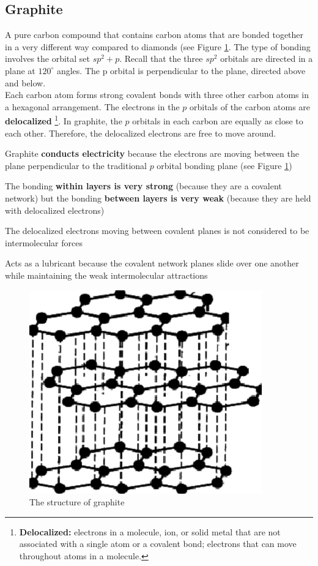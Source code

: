 \subsection{Graphite}
A pure carbon compound that contains carbon atoms that are bonded together in a very different 
way compared to diamonds (see Figure \ref{fig:graphite-structure}. The type of bonding involves the
orbital set $sp^2+p$. Recall that the three $sp^2$ orbitals are directed in a plane at $120^{\circ}$
angles. The p orbital is perpendicular to the plane, directed above and below.\\

Each carbon atom forms strong covalent bonds with three other carbon atoms in a hexagonal arrangement.
The electrons in the $p$ orbitals of the carbon atoms are \textbf{delocalized}
\footnote{
    \textbf{Delocalized:} electrons in a molecule, ion, or solid metal that are not associated
    with a single atom or a covalent bond; electrons that can move throughout atoms in a molecule.
}.
In graphite, the $p$ orbitals in each carbon are equally as close to each other. Therefore,
the delocalized electrons are free to move around.

\begin{bulleted-list}
    \item Graphite \textbf{conducts electricity} because the electrons are moving between the plane
        perpendicular to the traditional $p$ orbital bonding plane (see Figure \ref{fig:graphite-structure})
    \item The bonding \textbf{within layers is very strong} (because they are a covalent network)
        but the bonding \textbf{between layers is very weak} (because they are held with delocalized electrons)
    \item The delocalized electrons moving between covalent planes is not considered to be 
        intermolecular forces
    \item Acts as a lubricant because the covalent network planes slide over one another while
        maintaining the weak intermolecular attractions
\end{bulleted-list}

\begin{figure}[ht!]
    \centering
    \includegraphics[width=0.3 \textwidth]{../figures/graphite-struct.png}
    \caption{The structure of graphite}
    \label{fig:graphite-structure}
\end{figure}
